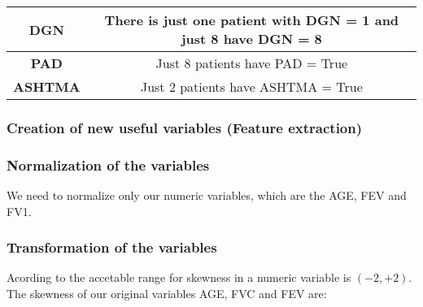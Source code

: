 \begin{center}
\begin{tabular}{|c|c|}
  \hline
  \textbf{DGN} & There is just one patient with DGN = 1 and just 8 have DGN = 8 \\
  \hline
  \textbf{PAD} & Just 8 patients have PAD = True \\
  \hline
  \textbf{ASHTMA} & Just 2 patients have ASHTMA = True \\
  \hline
\end{tabular}
\end{center}


%
\subsubsection{Creation of new useful variables (Feature extraction)}
\subsubsection{Normalization of the variables}
We need to normalize only our numeric variables, which are the AGE, FEV and FV1.


\subsubsection{Transformation of the variables}
Acording to  the accetable range for skewness in a numeric
variable is $(-2, +2)$. The skewness of our original variables AGE, FVC and FEV are:

